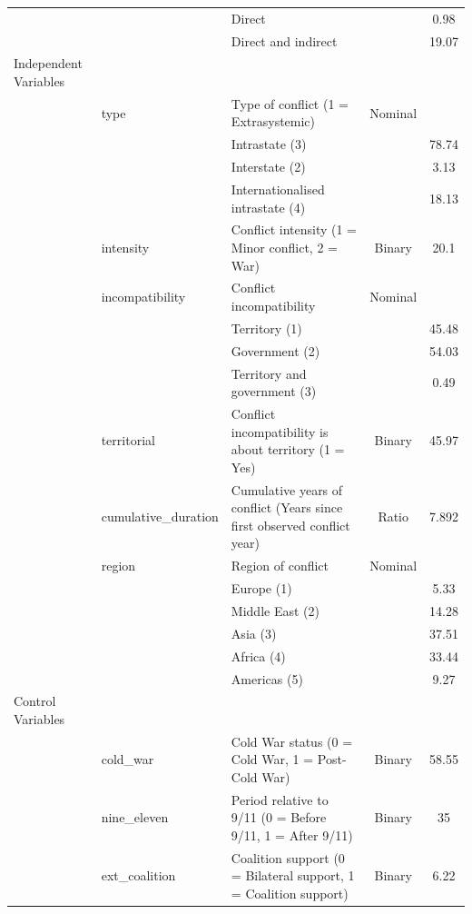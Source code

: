 \documentclass[
]{article}
\begin{document}
\begin{landscape}
\begin{longtable}[t]{ll>{\raggedright\arraybackslash}p{6cm}cc}
 &  & Direct &  & 0.98\\
 &  & Direct and indirect &  & 19.07\\
Independent Variables &  &  &  & \\
 & type & Type of conflict (1 = Extrasystemic) & Nominal & \\
\addlinespace
 &  & Intrastate (3) &  & 78.74\\
 &  & Interstate (2) &  & 3.13\\
 &  & Internationalised intrastate (4) &  & 18.13\\
 & intensity & Conflict intensity (1 = Minor conflict, 2 = War) & Binary & 20.1\\
 & incompatibility & Conflict incompatibility & Nominal & \\
\addlinespace
 &  & Territory (1) &  & 45.48\\
 &  & Government (2) &  & 54.03\\
 &  & Territory and government (3) &  & 0.49\\
 & territorial & Conflict incompatibility is about territory (1 = Yes) & Binary & 45.97\\
 & cumulative\_duration & Cumulative years of conflict (Years since first observed conflict year) & Ratio & 7.892\\
\addlinespace
 & region & Region of conflict & Nominal & \\
 &  & Europe (1) &  & 5.33\\
 &  & Middle East (2) &  & 14.28\\
 &  & Asia (3) &  & 37.51\\
 &  & Africa (4) &  & 33.44\\
\addlinespace
 &  & Americas (5) &  & 9.27\\
Control Variables &  &  &  & \\
 & cold\_war & Cold War status (0 = Cold War, 1 = Post-Cold War) & Binary & 58.55\\
 & nine\_eleven & Period relative to 9/11 (0 = Before 9/11, 1 = After 9/11) & Binary & 35\\
 & ext\_coalition & Coalition support (0 = Bilateral support, 1 = Coalition support) & Binary & 6.22\\*
\end{longtable}
\endgroup{}
\end{landscape}
\end{document}
